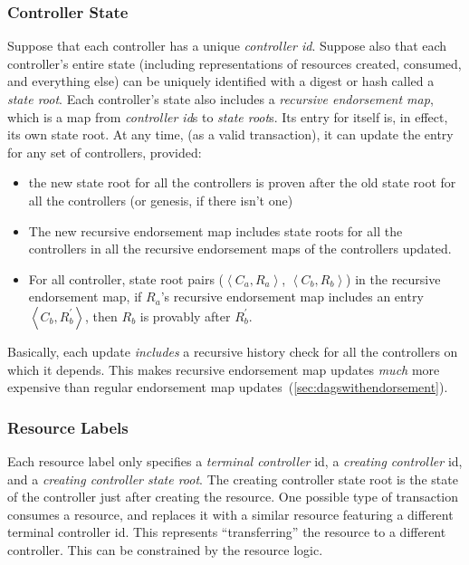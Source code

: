 \documentclass[a4paper,USenglish,cleveref, autoref, thm-restate, anonymous]{lipics-v2021}
\begin{document}
\subsubsection{Controller State}
Suppose that each controller has a unique \textit{controller id}.
Suppose also that each controller's entire state (including representations of resources created, consumed, and everything else) can be uniquely identified with a digest or hash called a \textit{state root}.
Each controller's state also includes a \textit{recursive endorsement map}, which is a map from \textit{controller id}s to \textit{state root}s.
Its entry for itself is, in effect, its own state root.
At any time, (as a valid transaction), it can update the entry for any set of controllers, provided:
\begin{itemize}
    \item the new state root for all the controllers is proven after the old state root for all the controllers (or genesis, if there isn't one)
    \item The new recursive endorsement map includes state roots for all the controllers in all the recursive endorsement maps of the controllers updated.
    \item For all controller, state root pairs ($\left\langle C_a, R_a\right\rangle$, $\left\langle C_b, R_b\right\rangle$) in the recursive endorsement map, if $R_a$'s recursive endorsement map includes an entry $\left\langle C_b, R_b^\prime\right\rangle$, then $R_b$ is provably after $R_b^\prime$.
\end{itemize}
Basically, each update \textit{includes} a recursive history check for all the controllers on which it depends.
This makes recursive endorsement map updates \emph{much} more expensive than regular endorsement map updates~(\cref{sec:dagswithendorsement}).

\subsubsection{Resource Labels}
Each resource label only specifies a \textit{terminal controller} id, a \textit{creating controller} id, and a \textit{creating controller state root}.
The creating controller state root is the state of the controller just after creating  the resource.
One possible type of transaction consumes a resource, and replaces it with a similar resource featuring a different terminal controller id.
This represents ``transferring'' the resource to a different controller. 
This can be constrained by the resource logic. 
\end{document}
